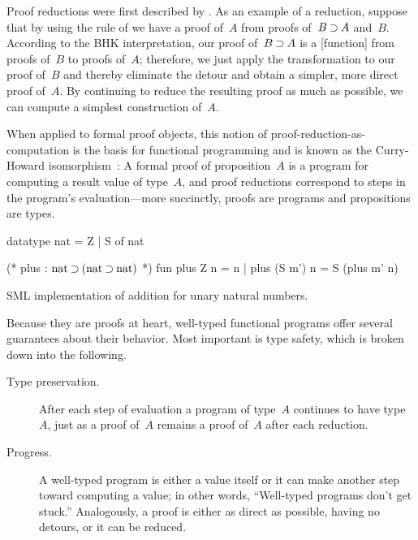Proof reductions were first described by \textcites{Gentzen:MZ35}{Prawitz:65}.
As an example of a reduction, suppose that by using the rule of  we have a proof of~$A$ from proofs of~$B \mathbin{\supset} A$ and~$B$.
According to the \ac{BHK} interpretation, our proof of~$B \mathbin{\supset} A$ is a [function] from proofs of~$B$ to proofs of~$A$; therefore,
we just apply the transformation to our proof of~$B$ and thereby eliminate the  detour and obtain a simpler, more direct proof of~$A$.
By continuing to reduce the resulting proof as much as possible, we can compute a simplest construction of~$A$.

When applied to formal proof objects, this notion of proof-reduction-as-computation is the basis for functional programming and is known as the Curry-Howard isomorphism~\autocites{Howard:Curry80}{Martin-Lof:LMPS80}:
A formal proof of proposition~$A$ is a program for computing a result value of type~$A$, and proof reductions correspond to steps in the program's evaluation---more succinctly, proofs are programs and propositions are types.

\begin{listing}[!t]
  \begin{pyglist}[language=sml, gobble=4, texcl=true]
    datatype nat = Z | S of nat
  
    (* plus : $\text{nat} \imp (\text{nat} \imp \text{nat})$ *) 
    fun plus Z n = n
      | plus (S m') n = S (plus m' n)
  \end{pyglist}
  \caption{\ac{SML} implementation of addition for unary natural numbers.\label{lst:smlplus}}
\end{listing}

Because they are proofs at heart, well-typed functional programs offer several guarantees about their behavior.
Most important is type safety, which is broken down into the following.
\begin{description}
\item[Type preservation.]
  After each step of evaluation a program of type~$A$ continues to have type~$A$, just as a proof of~$A$ remains a proof of~$A$ after each reduction.
%
\item[Progress.]
  A well-typed program is either a value itself or it can make another step toward computing a value; in other words, ``Well-typed programs don't get stuck.''
  Analogously, a proof is either as direct as possible, having no detours, or it can be reduced.
%
\end{description}

